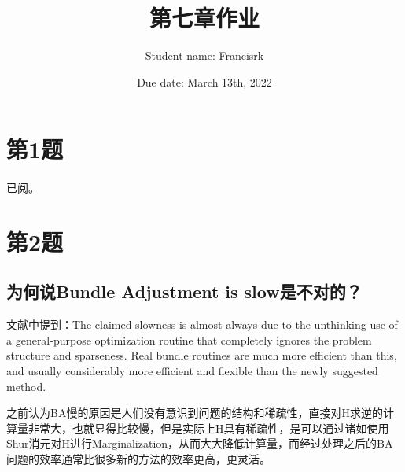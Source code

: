 \documentclass[40pt,a4paper，UTF8]{ctexart}
\title{第七章作业}
\author{Student name: Francisrk}
\date{Due date: March 13th, 2022}
\numberwithin{equation}{section}
\begin{document}
\maketitle   %

\section{第1题}
\paragraph{}
已阅。
\paragraph{}


\section{第2题}
\paragraph{}
\subsection{为何说Bundle Adjustment is slow是不对的？}
文献\cite{ref1}中提到：The claimed slowness is almost always due to the unthinking use of a general-purpose optimization routine that completely ignores
the problem structure and sparseness. Real bundle routines are much more efficient than this, and
usually considerably more efficient and flexible than the newly suggested method.

之前认为BA慢的原因是人们没有意识到问题的结构和稀疏性，直接对H求逆的计算量非常大，也就显得比较慢，但是实际上H具有稀疏性，是可以通过诸如使用Shur消元对H进行Marginalization，从而大大降低计算量，而经过处理之后的BA问题的效率通常比很多新的方法的效率更高，更灵活。
\end{document}
